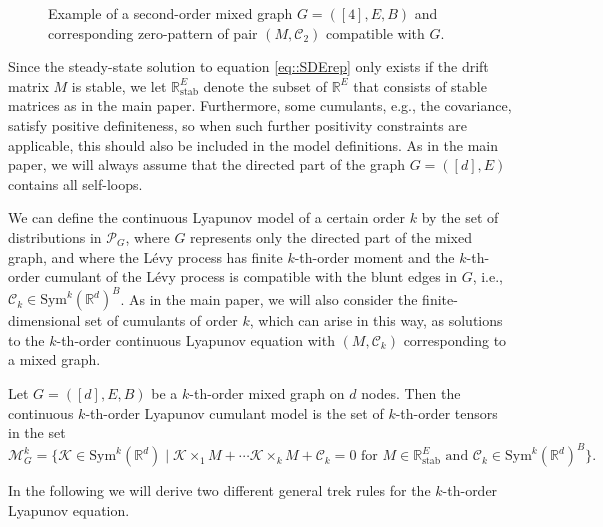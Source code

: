 \documentclass{biometrika}
\begin{document}
\begin{figure}[H]
\begin{center}
    \end{center}
    \caption{Example of a second-order mixed graph $G = ([4], E,B)$ and corresponding zero-pattern of pair $(M, \mathcal{C}_2)$ compatible with $G$.}  
    \label{fig::GeneralModel}
\end{figure}


Since the steady-state solution to equation \eqref{eq::SDErep} only exists if the drift matrix $M$ is stable, we let $\mathbb{R}^{E}_{\mathrm{stab}}$ denote the subset of $\mathbb{R}^{E}$ that consists of stable matrices as in the main paper. Furthermore, some cumulants, e.g., the covariance, satisfy positive definiteness, so when such further positivity constraints are applicable, this should also be included in the model definitions. 
As in the main paper, we will always assume that the directed part of the graph $G = ([d], E)$ contains all self-loops. 

We can define the continuous Lyapunov model of a certain order $k$ by the set of distributions in $\mathcal{P}_G$, where $G$ represents only the directed part of the mixed graph, and where the Lévy process has finite $k$-th-order moment and the $k$-th-order cumulant of the Lévy process is compatible with the blunt edges in $G$, i.e., $\mathcal{C}_k \in \mathrm{Sym}^k(\mathbb{R}^d)^B$. As in the main paper, we will also consider the finite-dimensional set of cumulants of order $k$, which can arise in this way, as solutions to the $k$-th-order continuous Lyapunov equation with $(M, \mathcal{C}_k)$ corresponding to a mixed graph. 
\begin{definition}
Let $G = ([d], E, B)$ be a $k$-th-order mixed graph on $d$ nodes. Then the continuous $k$-th-order Lyapunov cumulant model is the set of $k$-th-order tensors in the set
\begin{equation*}
    \mathcal{M}^{k}_{G} = \{ \mathcal{K} \in \mathrm{Sym}^k(\mathbb{R}^d) \; | \; \mathcal{K}  \times_1 M + \cdots \mathcal{K}  \times_k M + \mathcal{C}_k = 0 \text { for } M \in \mathbb{R}^{E}_{\mathrm{stab}} \text{ and } \mathcal{C}_k \in \mathrm{Sym}^k(\mathbb{R}^d)^B \}. 
\end{equation*}
\end{definition}
In the following we will derive two different general trek rules for the $k$-th-order Lyapunov equation.
\end{document}
